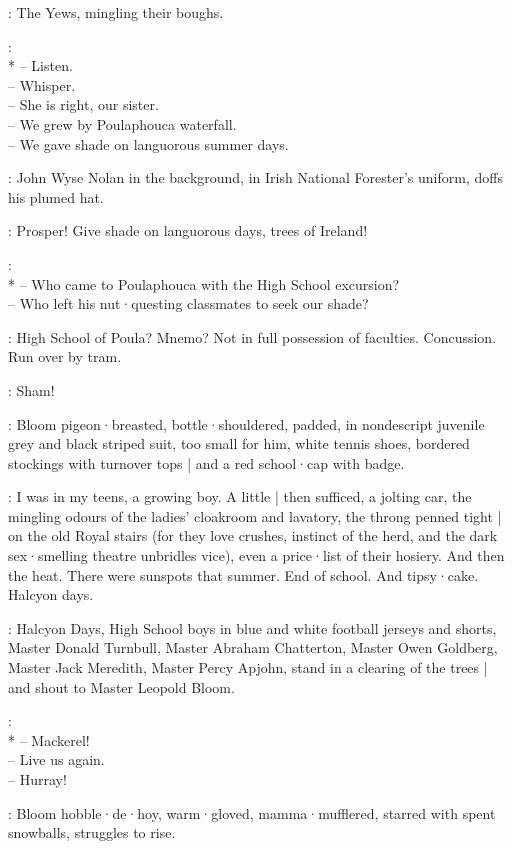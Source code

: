 :
The Yews,
mingling their boughs.

\Yews:\\*
-- Listen.\\
-- Whisper.\\
-- She is right, our sister.\\
-- We grew by Poulaphouca waterfall.\\
-- We gave shade on languorous summer days.

:
John Wyse Nolan in the background,
in Irish National Forester's uniform,
doffs his plumed hat.

\JohnWyse:
Prosper!
Give shade on languorous days,
trees of Ireland!

\Yews:
\\*
-- Who came to Poulaphouca with the High School excursion?\\
-- Who left his nut·questing classmates to seek our shade?

\Bloom:
High School of Poula?
Mnemo?
Not in full possession of faculties.
Concussion.
Run over by tram.

\Echo:
Sham!

:
Bloom pigeon·breasted,
bottle·shouldered,
padded,
in nondescript juvenile grey and black striped suit,
too small for him,
white tennis shoes,
bordered stockings with turnover tops |
and a red school·cap with badge.

\Bloom:
I was in my teens,
a growing boy.
A little |
then sufficed,
a jolting car,
the mingling odours of the ladies' cloakroom and lavatory,
%
the throng penned tight |
on the old Royal stairs
(for they love crushes,
instinct of the herd,
and the dark sex·smelling theatre unbridles vice),
even a price·list of their hosiery.
And then the heat.
There were sunspots that summer.
End of school.
And tipsy·cake.
Halcyon days.

:
Halcyon Days,
High School boys in blue and white football jerseys and shorts,
Master Donald Turnbull,
Master Abraham Chatterton,
Master Owen Goldberg,
Master Jack Meredith,
Master Percy Apjohn,
stand in a clearing of the trees |
and shout to Master Leopold Bloom.

\HalcyonDays:
\\*
-- Mackerel!\\
-- Live us again.\\
-- Hurray!\\

:
Bloom hobble·de·hoy,
warm·gloved,
mamma·mufflered,
starred with spent snowballs,
struggles to rise.

